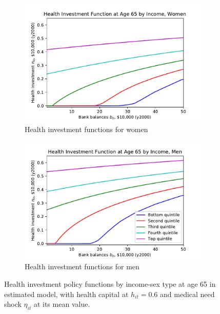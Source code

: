 \documentclass[12pt,pdftex,letterpaper]{article}
\newcommand{\Health}{h}
\newcommand{\MedShk}{\eta}
\begin{document}
\begin{figure}[h!]
    \centering
    \begin{subfigure}[b]{0.49\textwidth}
        \centering
        \includegraphics[width=\textwidth]{../Figures/iFuncWomen.pdf}
        \caption{Health investment functions for women}
    \end{subfigure}
    \begin{subfigure}[b]{0.49\textwidth}
        \centering
        \includegraphics[width=\textwidth]{../Figures/iFuncMen.pdf}
        \caption{Health investment functions for men}
    \end{subfigure}
    \caption{Health investment policy functions by income-sex type at age 65 in estimated model, with health capital at $\Health_{it}=0.6$ and medical need shock $\MedShk_{it}$ at its mean value.}
    \label{fig:iFunc}
\end{figure}
\end{document}
